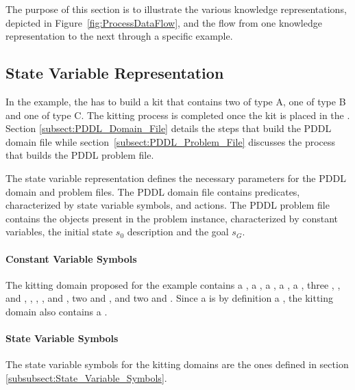 The purpose of this section is to illustrate the various knowledge representations, depicted in Figure~\ref{fig:ProcessDataFlow}, and the flow from one knowledge representation to the next through a specific example.

\subsection{State Variable Representation}

In the example, the  has to build a kit that contains two  of type A, one  of type B and one  of type C. The kitting process is completed once the kit is placed in the . Section \ref{subsect:PDDL_Domain_File} details the steps that build the PDDL domain file while section~\ref{subsect:PDDL_Problem_File} discusses the process that builds the PDDL problem file.

The state variable representation defines the necessary parameters for the PDDL domain and problem files. The PDDL domain file contains predicates, characterized by state variable symbols, and actions. The PDDL problem file contains the objects present in the problem instance, characterized by constant variables, the initial state $s_0$ description and the goal $s_G$.



\paragraph{Constant Variable Symbols}
The kitting domain proposed for the example contains a  , a  , a  , a  , a  , three  , , and ,  , , , and , two   and , and two    and . Since a  is by definition a , the kitting domain also contains a  .

\paragraph{State Variable Symbols}
The state variable symbols for the kitting domains are the ones defined in section \ref{subsubsect:State_Variable_Symbols}.

